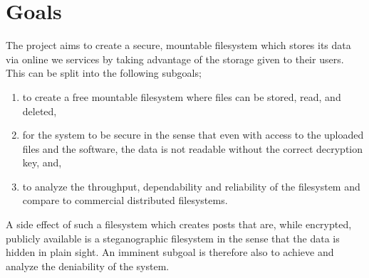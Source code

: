 
\section{Goals}


The project aims to create a secure, mountable filesystem which stores its data via online we services by taking advantage of the storage given to their users. This can be split into the following subgoals;
\begin{enumerate}
\item to create a free mountable filesystem where files can be stored, read, and deleted, %
\item for the system to be secure in the sense that even with access to the uploaded files and the software, the data is not readable without the correct decryption key, and, %
\item to analyze the throughput, dependability and reliability of the filesystem and compare to commercial distributed filesystems.
\end{enumerate}


A side effect of such a filesystem which creates posts that are, while encrypted, publicly available is a steganographic filesystem in the sense that the data is hidden in plain sight. An imminent subgoal is therefore also to achieve and analyze the deniability of the system.

